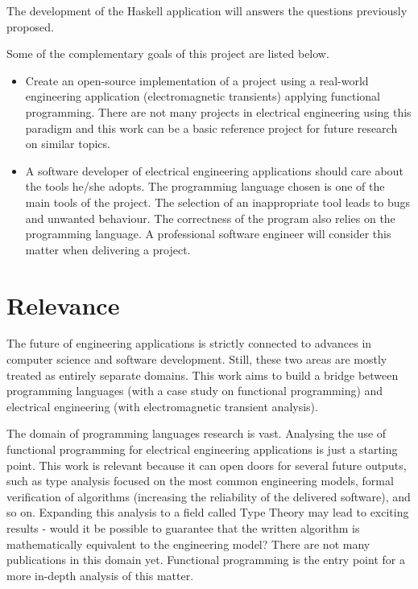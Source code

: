 The development of the Haskell application will answers the questions previously proposed.

Some of the complementary goals of this project are listed below.

\begin{itemize}
  \item Create an open-source implementation of a project using a real-world engineering application (electromagnetic transients) applying functional programming. There are not many projects in electrical engineering using this paradigm and this work can be a basic reference project for future research on similar topics.
  \item A software developer of electrical engineering applications should care about the tools he/she adopts. The programming language chosen is one of the main tools of the project. The selection of an inappropriate tool leads to bugs and unwanted behaviour. The correctness of the program also relies on the programming language. A professional software engineer will consider this matter when delivering a project.
\end{itemize}

\section{Relevance}

The future of engineering applications is strictly connected to advances in computer science and software development. Still, these two areas are mostly treated as entirely separate domains. This work aims to build a bridge between programming languages (with a case study on functional programming) and electrical engineering (with electromagnetic transient analysis).

The domain of programming languages research is vast. Analysing the use of functional programming for electrical engineering applications is just a starting point. This work is relevant because it can open doors for several future outputs, such as type analysis focused on the most common engineering models, formal verification of algorithms (increasing the reliability of the delivered software), and so on. Expanding this analysis to a field called Type Theory may lead to exciting results - would it be possible to guarantee that the written algorithm is mathematically equivalent to the engineering model? There are not many publications in this domain yet. Functional programming is the entry point for a more in-depth analysis of this matter.

